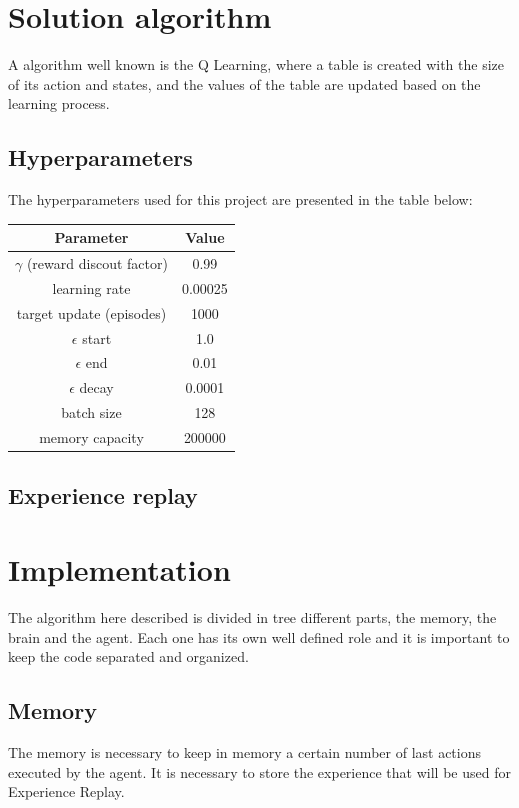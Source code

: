 \documentclass{article}
\begin{document}
\section{Solution algorithm}
A algorithm well known is the Q Learning, where a table is created with the size of its action and states, and the values of the table are updated based on the learning process.

\subsection{Hyperparameters}
The hyperparameters used for this project are presented in the table below:

\begin{center}
\begin{tabular}{ |c|c| } 
 \hline
 \textbf{Parameter} & \textbf{Value} \\ 
 \hline
 $\gamma$ (reward discout factor) & 0.99 \\ 
 learning rate & 0.00025 \\
 target update (episodes) & 1000 \\ 
 $\epsilon$ start & 1.0 \\ 
 $\epsilon$ end & 0.01 \\ 
 $\epsilon$ decay & 0.0001 \\ 
 batch size & 128 \\ 
 memory capacity & 200000 \\ 
 \hline
\end{tabular}
\end{center}



\subsection{Experience replay}

\section{Implementation}
The algorithm here described is divided in tree different parts, the memory, the brain and the agent. Each one has its own well defined role and it is important to keep the code separated and organized.

\subsection{Memory}
The memory is necessary to keep in memory a certain number of last actions executed by the agent. It is necessary to store the experience that will be used for Experience Replay.
\end{document}
